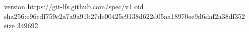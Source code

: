 version https://git-lfs.github.com/spec/v1
oid sha256:e96cdf759c2a7a9a91b27de00425c9138d622d05aa18970ee9d6daf2a38df352
size 349692
